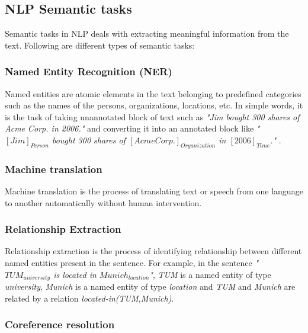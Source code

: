 \subsection{NLP Semantic tasks}

Semantic tasks in NLP deals with extracting meaningful information from the text. Following are different types of semantic tasks:

\subsubsection{Named Entity Recognition (NER)}

Named entities are atomic elements in the text belonging to predefined categories \cite{ner1} such as the names of the persons, organizations, locations, etc. In simple words, it is the task of taking unannotated block of text such as \textit{"Jim bought 300 shares of Acme Corp. in 2006."} and converting it into an annotated block like \textit{"$[Jim]_{Person}$ bought 300 shares of $[Acme Corp.]_{Organization}$ in $[2006]_{Time}$."} \cite{wiki:ner}.

\subsubsection{Machine translation}

Machine translation is the process of translating text or speech from one language to another automatically without human intervention.

\subsubsection{Relationship Extraction}

Relationship extraction is the process of identifying relationship between different named entities present in the sentence. For example, in the sentence \textit{"$TUM_{university}$ is located in $Munich_{location}$"}, \textit{TUM} is a named entity of type \textit{university}, \textit{Munich} is a named entity of type \textit{location} and \textit{TUM} and \textit{Munich} are related by a relation \textit{located-in(TUM,Munich)}.

\subsubsection{Coreference resolution}

